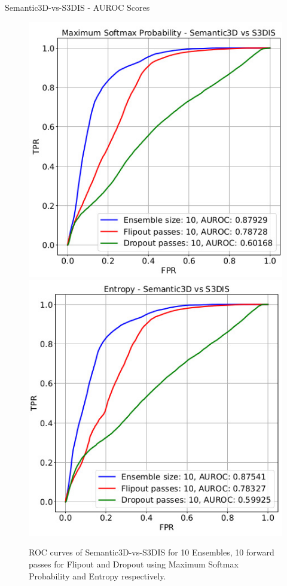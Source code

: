 \documentclass[aspectratio=169]{beamer}
\begin{document}
\begin{frame}{Semantic3D-vs-S3DIS - AUROC Scores}
    \begin{figure}
        \includegraphics[scale = 0.35]{images/ood1_msp_roc.jpg}
        \includegraphics[scale=0.35]{images/ood1_ent_roc.jpg}
        \caption{ROC curves of Semantic3D-vs-S3DIS for 10 Ensembles, 10 forward passes for Flipout and
        Dropout using Maximum Softmax Probability and Entropy respectively.}
    \end{figure}
\end{frame}
\end{document}
